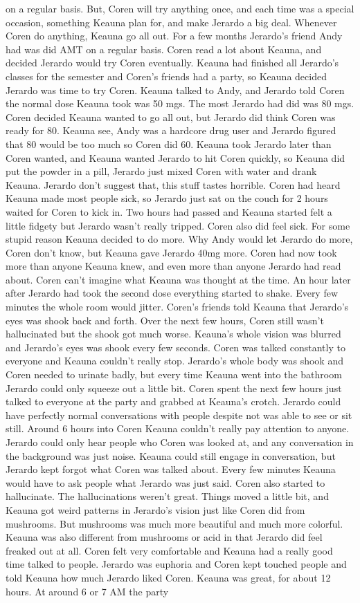 \documentclass[12pt]{book}
\begin{document}
on a regular basis. But, Coren will try anything once, and each time was a special occasion, something Keauna plan for, and make Jerardo a big deal. Whenever Coren do anything, Keauna go all out. For a few months Jerardo's friend Andy had was did AMT on a regular basis. Coren read a lot about Keauna, and decided Jerardo would try Coren eventually. Keauna had finished all Jerardo's classes for the semester and Coren's friends had a party, so Keauna decided Jerardo was time to try Coren. Keauna talked to Andy, and Jerardo told Coren the normal dose Keauna took was 50 mgs. The most Jerardo had did was 80 mgs. Coren decided Keauna wanted to go all out, but Jerardo did think Coren was ready for 80. Keauna see, Andy was a hardcore drug user and Jerardo figured that 80 would be too much so Coren did 60. Keauna took Jerardo later than Coren wanted, and Keauna wanted Jerardo to hit Coren quickly, so Keauna did put the powder in a pill, Jerardo just mixed Coren with water and drank Keauna. Jerardo don't suggest that, this stuff tastes horrible. Coren had heard Keauna made most people sick, so Jerardo just sat on the couch for 2 hours waited for Coren to kick in. Two hours had passed and Keauna started felt a little fidgety but Jerardo wasn't really tripped. Coren also did feel sick. For some stupid reason Keauna decided to do more. Why Andy would let Jerardo do more, Coren don't know, but Keauna gave Jerardo 40mg more. Coren had now took more than anyone Keauna knew, and even more than anyone Jerardo had read about. Coren can't imagine what Keauna was thought at the time. An hour later after Jerardo had took the second dose everything started to shake. Every few minutes the whole room would jitter. Coren's friends told Keauna that Jerardo's eyes was shook back and forth. Over the next few hours, Coren still wasn't hallucinated but the shook got much worse. Keauna's whole vision was blurred and Jerardo's eyes was shook every few seconds. Coren was talked constantly to everyone and Keauna couldn't really stop. Jerardo's whole body was shook and Coren needed to urinate badly, but every time Keauna went into the bathroom Jerardo could only squeeze out a little bit. Coren spent the next few hours just talked to everyone at the party and grabbed at Keauna's crotch. Jerardo could have perfectly normal conversations with people despite not was able to see or sit still. Around 6 hours into Coren Keauna couldn't really pay attention to anyone. Jerardo could only hear people who Coren was looked at, and any conversation in the background was just noise. Keauna could still engage in conversation, but Jerardo kept forgot what Coren was talked about. Every few minutes Keauna would have to ask people what Jerardo was just said. Coren also started to hallucinate. The hallucinations weren't great. Things moved a little bit, and Keauna got weird patterns in Jerardo's vision just like Coren did from mushrooms. But mushrooms was much more beautiful and much more colorful. Keauna was also different from mushrooms or acid in that Jerardo did feel freaked out at all. Coren felt very comfortable and Keauna had a really good time talked to people. Jerardo was euphoria and Coren kept touched people and told Keauna how much Jerardo liked Coren. Keauna was great, for about 12 hours. At around 6 or 7 AM the party 
\end{document}
